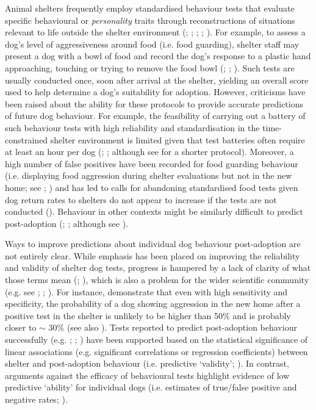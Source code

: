 \documentclass[12pt]{article}
\begin{document}
Animal shelters frequently employ standardised behaviour tests that evaluate specific behavioural or \textit{personality} traits through reconstructions of situations relevant to life outside the shelter environment (\cite{vanderborg1991}; \cite{marston2003}; \cite{mornement2010}; \cite{taylor2006}; \cite{rayment2015}). For example, to assess a dog's level of aggressiveness around food (i.e. food guarding), shelter staff may present a dog with a bowl of food and record the dog's response to a plastic hand approaching, touching or trying to remove the food bowl (\cite{mohangibbons2012}; \cite{mohangibbons2018}; \cite{marder2013}). Such tests are usually conducted once, soon after arrival at the shelter, yielding an overall score used to help determine a dog's suitability for adoption. However, criticisms have been raised about the ability for these protocols to provide accurate predictions of future dog behaviour. For example, the feasibility of carrying out a battery of such behaviour tests with high reliability and standardisation in the time-constrained shelter environment is limited given that test batteries often require at least an hour per dog (\cite{vanderborg1991}; \cite{mornement2009}; although see \textcite{poulsen2010} for a shorter protocol). Moreover, a high number of false positives have been recorded for food guarding behaviour (i.e. displaying food aggression during shelter evaluations but not in the new home; see \cite{mohangibbons2012}; \cite{marder2013}) and has led to calls for abandoning standardised food tests given dog return rates to shelters do not appear to increase if the tests are not conducted (\cite{mohangibbons2018}). Behaviour in other contexts might be similarly difficult to predict post-adoption (\cite{christensen2007}; \cite{mornement2015}; although see \textcite{bollen2008}).

Ways to improve predictions about individual dog behaviour post-adoption are not entirely clear. While emphasis has been placed on improving the reliability and validity of shelter dog tests, progress is hampered by a lack of clarity of what those terms mean (\cite{patronek2019}; \cite{rayment2015}), which is also a problem for the wider scientific community (e.g. see \cite{borsboom2004}; \cite{borsboom2009}; \cite{maul2016}). For instance, \textcite{patbrad2016} demonstrate that even with high sensitivity and specificity, the probability of a dog showing aggression in the new home after a positive test in the shelter is unlikely to be higher than 50\% and is probably closer to $\sim$ 30\% (see also \cite{patronek2019}). Tests reported to predict post-adoption behaviour successfully (e.g. \cite{valsecchi2011}; \cite{poulsen2010}; \cite{bollen2008}) have been supported based on the statistical significance of linear associations (e.g. significant correlations or regression coefficients) between shelter and post-adoption behaviour (i.e. predictive `validity'; \cite{patronek2019}). In contrast, arguments against the efficacy of behavioural tests highlight evidence of low predictive `ability' for individual dogs (i.e. estimates of true/false positive and negative rates; \cite{patronek2019}).
\end{document}
